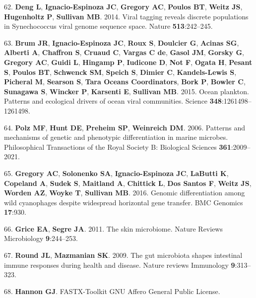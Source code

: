 \documentclass[12pt,]{article}
\begin{document}
\hypertarget{ref-Deng:2014eb}{}
62. \textbf{Deng L}, \textbf{Ignacio-Espinoza JC}, \textbf{Gregory AC},
\textbf{Poulos BT}, \textbf{Weitz JS}, \textbf{Hugenholtz P},
\textbf{Sullivan MB}. 2014. Viral tagging reveals discrete populations
in Synechococcus viral genome sequence space. Nature
\textbf{513}:242--245.

\hypertarget{ref-Brum:2015iaa}{}
63. \textbf{Brum JR}, \textbf{Ignacio-Espinoza JC}, \textbf{Roux S},
\textbf{Doulcier G}, \textbf{Acinas SG}, \textbf{Alberti A},
\textbf{Chaffron S}, \textbf{Cruaud C}, \textbf{Vargas C de},
\textbf{Gasol JM}, \textbf{Gorsky G}, \textbf{Gregory AC}, \textbf{Guidi
L}, \textbf{Hingamp P}, \textbf{Iudicone D}, \textbf{Not F},
\textbf{Ogata H}, \textbf{Pesant S}, \textbf{Poulos BT},
\textbf{Schwenck SM}, \textbf{Speich S}, \textbf{Dimier C},
\textbf{Kandels-Lewis S}, \textbf{Picheral M}, \textbf{Searson S},
\textbf{Tara Oceans Coordinators}, \textbf{Bork P}, \textbf{Bowler C},
\textbf{Sunagawa S}, \textbf{Wincker P}, \textbf{Karsenti E},
\textbf{Sullivan MB}. 2015. Ocean plankton. Patterns and ecological
drivers of ocean viral communities. Science
\textbf{348}:1261498--1261498.

\hypertarget{ref-Polz:2006fi}{}
64. \textbf{Polz MF}, \textbf{Hunt DE}, \textbf{Preheim SP},
\textbf{Weinreich DM}. 2006. Patterns and mechanisms of genetic and
phenotypic differentiation in marine microbes. Philosophical
Transactions of the Royal Society B: Biological Sciences
\textbf{361}:2009--2021.

\hypertarget{ref-Gregory:2016cg}{}
65. \textbf{Gregory AC}, \textbf{Solonenko SA}, \textbf{Ignacio-Espinoza
JC}, \textbf{LaButti K}, \textbf{Copeland A}, \textbf{Sudek S},
\textbf{Maitland A}, \textbf{Chittick L}, \textbf{Dos Santos F},
\textbf{Weitz JS}, \textbf{Worden AZ}, \textbf{Woyke T},
\textbf{Sullivan MB}. 2016. Genomic differentiation among wild
cyanophages despite widespread horizontal gene transfer. BMC Genomics
\textbf{17}:930.

\hypertarget{ref-Grice:2011gy}{}
66. \textbf{Grice EA}, \textbf{Segre JA}. 2011. The skin microbiome.
Nature Reviews Microbiology \textbf{9}:244--253.

\hypertarget{ref-Round:2009bz}{}
67. \textbf{Round JL}, \textbf{Mazmanian SK}. 2009. The gut microbiota
shapes intestinal immune responses during health and disease. Nature
reviews Immunology \textbf{9}:313--323.

\hypertarget{ref-FASTXToolkit:wr}{}
68. \textbf{Hannon GJ}. FASTX-Toolkit GNU Affero General Public License.
\end{document}
